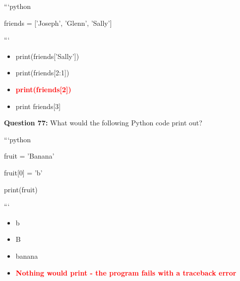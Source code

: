\documentclass[12pt,a4paper]{article}
\begin{document}
\newline
\newline

\newline
```python\newline

\newline
friends = ['Joseph', 'Glenn', 'Sally']\newline

\newline
```

\begin{itemize}
    \item[\textbf{A.}] print(friends['Sally'])
    \item[\textbf{B.}] print(friends[2:1])
    \item[\textbf{C.}] \textcolor{red}{\textbf{print(friends[2])}}
    \item[\textbf{D.}] print friends[3]
\end{itemize}

\vspace{0.5cm}

\textbf{Question 77:} What would the following Python code print out?\newline

\newline
\newline

\newline
```python\newline

\newline
fruit = 'Banana'\newline

\newline
fruit[0] = 'b'\newline

\newline
print(fruit)\newline

\newline
```

\begin{itemize}
    \item[\textbf{A.}] b
    \item[\textbf{B.}] B
    \item[\textbf{C.}] banana
    \item[\textbf{D.}] \textcolor{red}{\textbf{Nothing would print - the program fails with a traceback error}}
\end{itemize}
\end{document}
